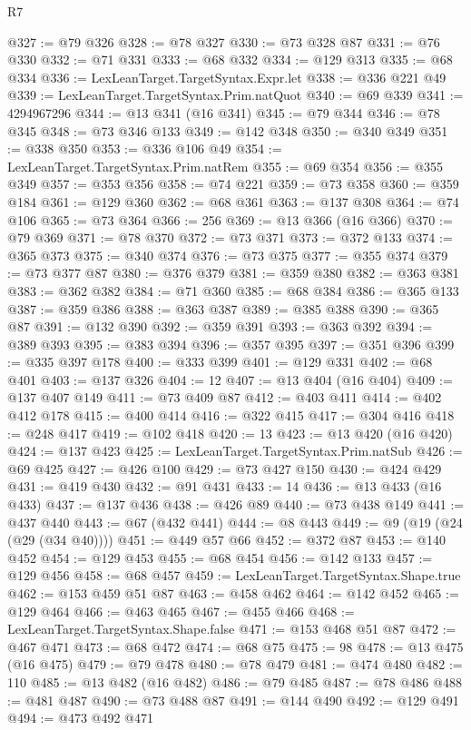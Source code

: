 \begin{lexlean}{R7}
\begin{coremodule}
@327 := @79 @326
@328 := @78 @327
@330 := @73 @328 @87
@331 := @76 @330
@332 := @71 @331
@333 := @68 @332
@334 := @129 @313
@335 := @68 @334
@336 := LexLeanTarget.TargetSyntax.Expr.let
@338 := @336 @221 @49
@339 := LexLeanTarget.TargetSyntax.Prim.natQuot
@340 := @69 @339
@341 := 4294967296
@344 := @13 @341 (@16 @341)
@345 := @79 @344
@346 := @78 @345
@348 := @73 @346 @133
@349 := @142 @348
@350 := @340 @349
@351 := @338 @350
@353 := @336 @106 @49
@354 := LexLeanTarget.TargetSyntax.Prim.natRem
@355 := @69 @354
@356 := @355 @349
@357 := @353 @356
@358 := @74 @221
@359 := @73 @358
@360 := @359 @184
@361 := @129 @360
@362 := @68 @361
@363 := @137 @308
@364 := @74 @106
@365 := @73 @364
@366 := 256
@369 := @13 @366 (@16 @366)
@370 := @79 @369
@371 := @78 @370
@372 := @73 @371
@373 := @372 @133
@374 := @365 @373
@375 := @340 @374
@376 := @73 @375
@377 := @355 @374
@379 := @73 @377 @87
@380 := @376 @379
@381 := @359 @380
@382 := @363 @381
@383 := @362 @382
@384 := @71 @360
@385 := @68 @384
@386 := @365 @133
@387 := @359 @386
@388 := @363 @387
@389 := @385 @388
@390 := @365 @87
@391 := @132 @390
@392 := @359 @391
@393 := @363 @392
@394 := @389 @393
@395 := @383 @394
@396 := @357 @395
@397 := @351 @396
@399 := @335 @397 @178
@400 := @333 @399
@401 := @129 @331
@402 := @68 @401
@403 := @137 @326
@404 := 12
@407 := @13 @404 (@16 @404)
@409 := @137 @407 @149
@411 := @73 @409 @87
@412 := @403 @411
@414 := @402 @412 @178
@415 := @400 @414
@416 := @322 @415
@417 := @304 @416
@418 := @248 @417
@419 := @102 @418
@420 := 13
@423 := @13 @420 (@16 @420)
@424 := @137 @423
@425 := LexLeanTarget.TargetSyntax.Prim.natSub
@426 := @69 @425
@427 := @426 @100
@429 := @73 @427 @150
@430 := @424 @429
@431 := @419 @430
@432 := @91 @431
@433 := 14
@436 := @13 @433 (@16 @433)
@437 := @137 @436
@438 := @426 @89
@440 := @73 @438 @149
@441 := @437 @440
@443 := @67 (@432 @441)
@444 := @8 @443
@449 := @9 (@19 (@24 (@29 (@34 @40))))
@451 := @449 @57 @66
@452 := @372 @87
@453 := @140 @452
@454 := @129 @453
@455 := @68 @454
@456 := @142 @133
@457 := @129 @456
@458 := @68 @457
@459 := LexLeanTarget.TargetSyntax.Shape.true
@462 := @153 @459 @51 @87
@463 := @458 @462
@464 := @142 @452
@465 := @129 @464
@466 := @463 @465
@467 := @455 @466
@468 := LexLeanTarget.TargetSyntax.Shape.false
@471 := @153 @468 @51 @87
@472 := @467 @471
@473 := @68 @472
@474 := @68 @75
@475 := 98
@478 := @13 @475 (@16 @475)
@479 := @79 @478
@480 := @78 @479
@481 := @474 @480
@482 := 110
@485 := @13 @482 (@16 @482)
@486 := @79 @485
@487 := @78 @486
@488 := @481 @487
@490 := @73 @488 @87
@491 := @144 @490
@492 := @129 @491
@494 := @473 @492 @471

\end{coremodule}
\end{lexlean}
